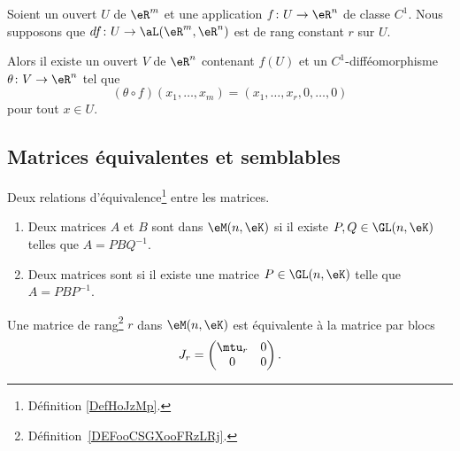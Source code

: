 \begin{theorem}	\label{THOooSEAZooOYSsmP}
	Soient un ouvert \( U\) de \( \eR^m\) et une application \(f \colon U\to \eR^n  \) de classe \( C^1\). Nous supposons que \(df \colon U\to \aL(\eR^m,\eR^n)  \) est de rang constant \( r\) sur \( U\).

	Alors il existe un ouvert \( V\) de \( \eR^n\) contenant \( f(U)\) et un \( C^1\)-difféomorphisme \(\theta \colon V\to \eR^n  \) tel que
	\begin{equation}
		(\theta\circ f)(x_1,\ldots,x_m)=(x_1,\ldots,x_r,0,\ldots,0)
	\end{equation}
	pour tout \( x\in U\).

\end{theorem}


\subsection{Matrices équivalentes et semblables}

\begin{propositionDef}  \label{DefBLELooTvlHoB}
	Deux relations d'équivalence\footnote{Définition \ref{DefHoJzMp}.} entre les matrices.
	\begin{enumerate}
		\item   \label{ItemPFXCooOUbSCt}
		      Deux matrices \( A\) et \( B\) sont  dans \( \eM(n,\eK)\) si il existe \( P,Q\in\GL(n,\eK)\) telles que \( A=PBQ^{-1}\).
		\item
		      Deux matrices sont  si il existe une matrice \( P\in \GL(n,\eK)\) telle que \( A=PBP^{-1}\).
	\end{enumerate}
\end{propositionDef}

\begin{lemma}   \label{LemZMxxnfM}
	Une matrice de rang\footnote{Définition~\ref{DEFooCSGXooFRzLRj}.} \( r\) dans \( \eM(n,\eK)\) est équivalente à la matrice par blocs
	\begin{equation}
		J_r=\begin{pmatrix}
			\mtu_r & 0 \\
			0      & 0
		\end{pmatrix}.
	\end{equation}
\end{lemma}

